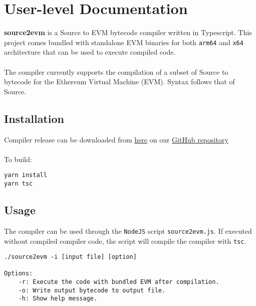 \tableofcontents
\setcounter{secnumdepth}{3}
\newpage


\label{Chapter1} %


\newcommand{\keyword}[1]{\textbf{#1}}
\newcommand{\tabhead}[1]{\textbf{#1}}
\newcommand{\code}[1]{\texttt{#1}}
\newcommand{\file}[1]{\texttt{\bfseries#1}}
\newcommand{\option}[1]{\texttt{\itshape#1}}


\section{User-level Documentation}
\textbf{source2evm} is a Source to EVM bytecode compiler written in Typescript. This project comes bundled with standalone EVM binaries for both \code{arm64} and \code{x64} architecture that can be used to execute compiled code.\\\\
The compiler currently supports the compilation of a subset of Source to bytecode for the Ethereum Virtual Machine (EVM). Syntax follows that of Source. 

\subsection{Installation}
Compiler release can be downloaded from \href{https://github.com/chence08/source2evm/releases/download/v1.0/source2evm_v1.zip}{here} on our \href{https://github.com/chence08/source2evm}{GitHub repository}\\\\
To build: 
\begin{verbatim}
yarn install
yarn tsc
\end{verbatim}

\subsection{Usage}
The compiler can be used through the \code{NodeJS} script \code{source2evm.js}. If executed without compiled compiler code, the script will compile the compiler with \code{tsc}. 
\begin{verbatim}
./source2evm -i [input file] [option]

Options: 
    -r: Execute the code with bundled EVM after compilation. 
    -o: Write output bytecode to output file. 
    -h: Show help message. 
\end{verbatim}

